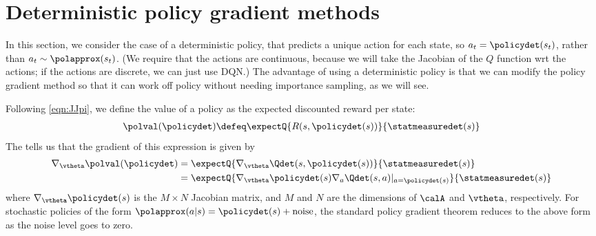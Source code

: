 \section{Deterministic policy gradient methods}
\label{sec:DPG}

In this section, we consider the case of a deterministic
policy, that predicts a unique action for each state,
so $a_t = \policydet(s_t)$,
rather than $a_t \sim \polapprox(s_t)$.
(We require that the actions are continuous,
because we will take the Jacobian of the $Q$ function
wrt the actions; if the actions are discrete,
we can just use DQN.)
The advantage of using a deterministic policy
is that we can modify the policy gradient method
so that it can work off policy without
needing importance sampling, as we will see.


Following
\cref{eqn:JJpi},
we define the value of a policy as the expected discounted
reward per state:
\begin{align}
\polval(\policydet)
\defeq  \expectQ{R(s,\policydet(s))}{\statmeasuredet(s)}
\end{align}
The 
\citep{dpg} tells us that the gradient of this expression
is given by
\begin{align}
\nabla_{\vtheta} \polval(\policydet)
&=  \expectQ{\nabla_{\vtheta} \Qdet(s,
  \policydet(s))}
      {\statmeasuredet(s)} \\
&= \expectQ{\nabla_{\vtheta} \policydet(s)
 \nabla_a \Qdet(s, a)|_{a=\policydet(s)}}{\statmeasuredet(s)}
\label{eqn:DDPGgrad}
\end{align}
where $\nabla_{\vtheta} \policydet(s)$ is
the $M \times N$ Jacobian matrix,
and $M$ and $N$ are the dimensions
of $\calA$ and $\vtheta$, respectively.
For stochastic policies of the form
$\polapprox(a|s) = \policydet(s) + \text{noise}$,
the standard policy gradient theorem reduces
to the above form as the noise level goes to zero.


